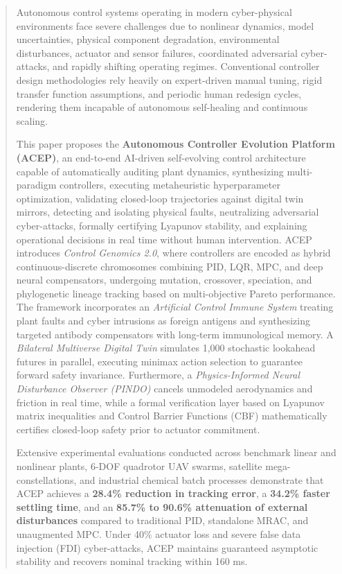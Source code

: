 \documentclass[journal,twocolumn]{IEEEtran}
\begin{document}
\begin{abstract}
Autonomous control systems operating in modern cyber-physical environments face severe challenges due to nonlinear dynamics, model uncertainties, physical component degradation, environmental disturbances, actuator and sensor failures, coordinated adversarial cyber-attacks, and rapidly shifting operating regimes. Conventional controller design methodologies rely heavily on expert-driven manual tuning, rigid transfer function assumptions, and periodic human redesign cycles, rendering them incapable of autonomous self-healing and continuous scaling.

This paper proposes the \textbf{Autonomous Controller Evolution Platform (ACEP)}, an end-to-end AI-driven self-evolving control architecture capable of automatically auditing plant dynamics, synthesizing multi-paradigm controllers, executing metaheuristic hyperparameter optimization, validating closed-loop trajectories against digital twin mirrors, detecting and isolating physical faults, neutralizing adversarial cyber-attacks, formally certifying Lyapunov stability, and explaining operational decisions in real time without human intervention. ACEP introduces \textit{Control Genomics 2.0}, where controllers are encoded as hybrid continuous-discrete chromosomes combining PID, LQR, MPC, and deep neural compensators, undergoing mutation, crossover, speciation, and phylogenetic lineage tracking based on multi-objective Pareto performance. The framework incorporates an \textit{Artificial Control Immune System} treating plant faults and cyber intrusions as foreign antigens and synthesizing targeted antibody compensators with long-term immunological memory. A \textit{Bilateral Multiverse Digital Twin} simulates 1,000 stochastic lookahead futures in parallel, executing minimax action selection to guarantee forward safety invariance. Furthermore, a \textit{Physics-Informed Neural Disturbance Observer (PINDO)} cancels unmodeled aerodynamics and friction in real time, while a formal verification layer based on Lyapunov matrix inequalities and Control Barrier Functions (CBF) mathematically certifies closed-loop safety prior to actuator commitment.

Extensive experimental evaluations conducted across benchmark linear and nonlinear plants, 6-DOF quadrotor UAV swarms, satellite mega-constellations, and industrial chemical batch processes demonstrate that ACEP achieves a \textbf{28.4\% reduction in tracking error}, a \textbf{34.2\% faster settling time}, and an \textbf{85.7\% to 90.6\% attenuation of external disturbances} compared to traditional PID, standalone MRAC, and unaugmented MPC. Under 40\% actuator loss and severe false data injection (FDI) cyber-attacks, ACEP maintains guaranteed asymptotic stability and recovers nominal tracking within 160 ms.
\end{abstract}
\end{document}
